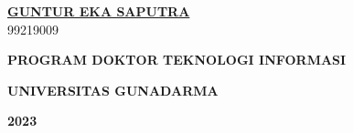 \begin{center}
\vspace{1cm}
{\large \underline{\textbf{GUNTUR EKA SAPUTRA}}\\
\vspace{0.1cm}99219009}


\vspace{2.5cm}

{\fontsize{12}{48} \selectfont \textbf{PROGRAM DOKTOR TEKNOLOGI INFORMASI}}%

{\fontsize{12}{48} \selectfont \textbf{UNIVERSITAS GUNADARMA}} %

{\fontsize{12}{48} \selectfont \textbf{2023}}

\end{center} 